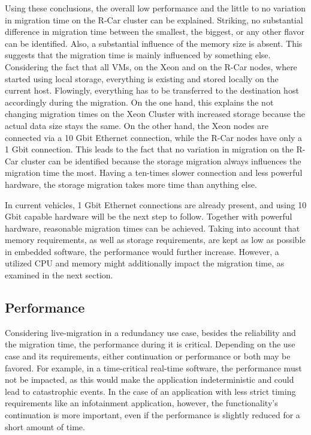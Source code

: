            \noindent Using these conclusions, the overall low performance and the little to no variation in migration time on the R-Car cluster can be explained.
            Striking, no substantial difference in migration time between the smallest, the biggest, or any other flavor can be identified.
            Also, a substantial influence of the memory size is absent.
            This suggests that the migration time is mainly influenced by something else.
            Considering the fact that all \acp{VM}, on the Xeon and on the R-Car nodes, where started using local storage, everything is existing and stored locally on the current host.
            Flowingly, everything has to be transferred to the destination host accordingly during the migration. 
            On the one hand, this explains the not changing migration times on the Xeon Cluster with increased storage because the actual data size stays the same.
            On the other hand, the Xeon nodes are connected via a 10 Gbit Ethernet connection, while the R-Car nodes have only a 1 Gbit connection.
            This leads to the fact that no variation in migration on the R-Car cluster can be identified because the storage migration always influences the migration time the most.
            Having a ten-times slower connection and less powerful hardware, the storage migration takes more time than anything else.
            
            \noindent In current vehicles, 1 Gbit Ethernet connections are already present, and using 10 Gbit capable hardware will be the next step to follow.
            Together with powerful hardware, reasonable migration times can be achieved.
            Taking into account that memory requirements, as well as storage requirements, are kept as low as possible in embedded software, the performance would further increase.
            However, a utilized CPU and memory might additionally impact the migration time, as examined in the next section. 
        
        
    \subsection{Performance}
    \label{subsection:usecases_performance}
    
            \noindent Considering live-migration in a redundancy use case, besides the reliability and the migration time, the performance during it is critical.
            Depending on the use case and its requirements, either continuation or performance or both may be favored.
            For example, in a time-critical real-time software, the performance must not be impacted, as this would make the application indeterministic and could lead to catastrophic events.
            In the case of an application with less strict timing requirements like an infotainment application, however, the functionality's continuation is more important, even if the performance is slightly reduced for a short amount of time.
            
